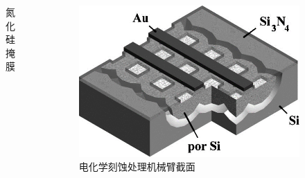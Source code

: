\begin{frame}[c]
\begin{columns}
\begin{column}{.4\textwidth}
\begin{figure}[!htb]
                \caption{氮化硅掩膜} %
            \end{figure}
        \end{column}
        \begin{column}{.3\textwidth}
            \begin{figure}[!htb] %
                \centering %
                \includegraphics[width=1.\textwidth]{figures/Microspectrometer based on a tunable optical filter of porous silicon_7.png} %
                \caption{电化学刻蚀处理机械臂截面} %
            \end{figure}
        \end{column}
    \end{columns}
\end{frame}

